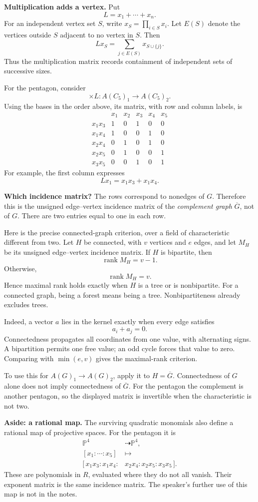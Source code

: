 \medskip\noindent
\textbf{Multiplication adds a vertex.}
Put
$$
L=x_1+\cdots+x_n.
$$
For an independent vertex set $S$,
write $x_S=\prod_{i\in S}x_i$.
Let $E(S)$ denote the vertices outside
$S$ adjacent to no vertex in $S$.
Then
$$
Lx_S=\sum_{j\in E(S)}x_{S\cup\{j\}}.
$$
Thus the multiplication matrix records
containment of independent sets of
successive sizes.

For the pentagon, consider
$$
\times L:A(C_5)_1\longrightarrow A(C_5)_2.
$$
Using the bases in the order above,
its matrix, with row and column labels,
is
$$
\begin{array}{c|ccccc}
 &x_1&x_2&x_3&x_4&x_5\\ \hline
x_1x_3&1&0&1&0&0\\
x_1x_4&1&0&0&1&0\\
x_2x_4&0&1&0&1&0\\
x_2x_5&0&1&0&0&1\\
x_3x_5&0&0&1&0&1
\end{array}
$$
For example, the first column expresses
$$
Lx_1=x_1x_3+x_1x_4.
$$

\medskip\noindent
\textbf{Which incidence matrix?}
The rows correspond to nonedges of $G$.
Therefore this is the unsigned
edge--vertex incidence matrix of the
\emph{complement graph} $\overline G$,
not of $G$.
There are two entries equal to one
in each row.

Here is the precise connected-graph
criterion, over a field of
characteristic different from two.
Let $H$ be connected, with $v$ vertices
and $e$ edges, and let $M_H$ be its
unsigned edge--vertex incidence matrix.
If $H$ is bipartite, then
$$
\operatorname{rank}M_H=v-1.
$$
Otherwise,
$$
\operatorname{rank}M_H=v.
$$
Hence maximal rank holds exactly when
$H$ is a tree or is nonbipartite.
For a connected graph, being a forest
means being a tree.
Nonbipartiteness already excludes trees.

Indeed, a vector $a$ lies in the kernel
exactly when every edge satisfies
$$
a_i+a_j=0.
$$
Connectedness propagates all coordinates
from one value, with alternating signs.
A bipartition permits one free value;
an odd cycle forces that value to zero.
Comparing with $\min(e,v)$ gives the
maximal-rank criterion.

To use this for $A(G)_1\to A(G)_2$,
apply it to $H=\overline G$.
Connectedness of $G$ alone does not
imply connectedness of $\overline G$.
For the pentagon the complement is
another pentagon, so the displayed
matrix is invertible when the
characteristic is not two.

\medskip\noindent
\textbf{Aside: a rational map.}
The surviving quadratic monomials also
define a rational map of projective
spaces. For the pentagon it is
$$
\begin{aligned}
\mathbb P^4&\dashrightarrow\mathbb P^4,\\
[x_1:\cdots:x_5]&\longmapsto\\
[\,x_1x_3:x_1x_4:&x_2x_4:x_2x_5:x_3x_5\,].
\end{aligned}
$$
These are polynomials in $R$, evaluated
where they do not all vanish.
Their exponent matrix is the same
incidence matrix.
The speaker's further use of this map
is not in the notes.

